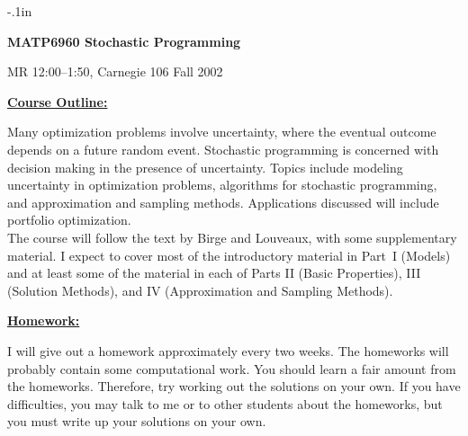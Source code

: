 
\pagestyle{empty}
\newcommand{\til}{\char '176}

\oddsidemargin -.1in
\textwidth 5.8in
\textheight 8.5in
\topmargin -30pt


\renewcommand{\baselinestretch}{1.2}



\begin{center}
  {\large\bf  MATP6960 Stochastic Programming}
\end{center}

\begin{flushright}  MR 12:00--1:50, Carnegie 106
       \hspace*{\fill}   Fall 2002  \end{flushright} 

{\raggedright  {\bf \underline{Course Outline:}} }

\noindent
Many optimization problems involve uncertainty,
where the eventual outcome depends on a future random event.
Stochastic programming is concerned with decision making
in the presence of uncertainty.
Topics include
modeling uncertainty in optimization problems,
algorithms for stochastic programming, and
approximation and sampling methods.
Applications discussed will include portfolio optimization.  \\

\noindent
The course will follow the text by Birge and Louveaux,
with some supplementary material.
I expect to cover most of the introductory material in Part~I (Models)
and at least some of the material in each of Parts II (Basic Properties),
III (Solution Methods), and IV (Approximation and Sampling Methods).  \\


{\raggedright {\bf \underline{Homework:}} }

\noindent
I will give out a homework approximately every two weeks.
The homeworks will probably contain some computational work.
You should learn a fair amount from the homeworks.
  Therefore, try working out the solutions on your own.
  If you have difficulties,
  you may talk to me or to other students about the homeworks,
  but you must write up your solutions on your own.   \\

